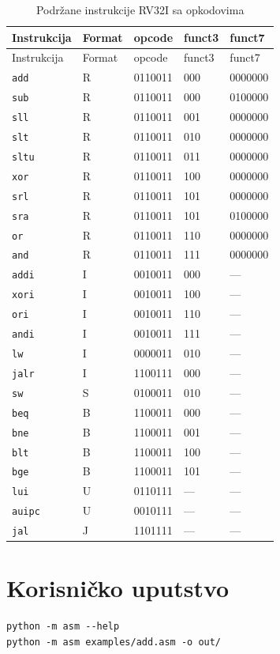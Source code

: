 {\small
\begin{longtable}{@{}lllll@{}}
  \caption{Podržane instrukcije RV32I sa opkodovima}\label{tab:opkodovi}\\
  \toprule
  Instrukcija & Format & opcode & funct3 & funct7 \\
  \midrule
  \endfirsthead
  \toprule
  Instrukcija & Format & opcode & funct3 & funct7 \\
  \midrule
  \endhead
  \texttt{add}   & R & 0110011 & 000 & 0000000 \\
  \texttt{sub}   & R & 0110011 & 000 & 0100000 \\
  \texttt{sll}   & R & 0110011 & 001 & 0000000 \\
  \texttt{slt}   & R & 0110011 & 010 & 0000000 \\
  \texttt{sltu}  & R & 0110011 & 011 & 0000000 \\
  \texttt{xor}   & R & 0110011 & 100 & 0000000 \\
  \texttt{srl}   & R & 0110011 & 101 & 0000000 \\
  \texttt{sra}   & R & 0110011 & 101 & 0100000 \\
  \texttt{or}    & R & 0110011 & 110 & 0000000 \\
  \texttt{and}   & R & 0110011 & 111 & 0000000 \\
  \midrule
  \texttt{addi}  & I & 0010011 & 000 & --- \\
  \texttt{xori}  & I & 0010011 & 100 & --- \\
  \texttt{ori}   & I & 0010011 & 110 & --- \\
  \texttt{andi}  & I & 0010011 & 111 & --- \\
  \texttt{lw}    & I & 0000011 & 010 & --- \\
  \texttt{jalr}  & I & 1100111 & 000 & --- \\
  \midrule
  \texttt{sw}    & S & 0100011 & 010 & --- \\
  \midrule
  \texttt{beq}   & B & 1100011 & 000 & --- \\
  \texttt{bne}   & B & 1100011 & 001 & --- \\
  \texttt{blt}   & B & 1100011 & 100 & --- \\
  \texttt{bge}   & B & 1100011 & 101 & --- \\
  \midrule
  \texttt{lui}   & U & 0110111 & --- & --- \\
  \texttt{auipc} & U & 0010111 & --- & --- \\
  \midrule
  \texttt{jal}   & J & 1101111 & --- & --- \\
  \bottomrule
\end{longtable}
}

\section{Korisničko uputstvo}
\label{sec:prilog-uputstvo}

\begin{lstlisting}[caption={Osnovno korišćenje asemblera}]
python -m asm --help
python -m asm examples/add.asm -o out/
\end{lstlisting}
